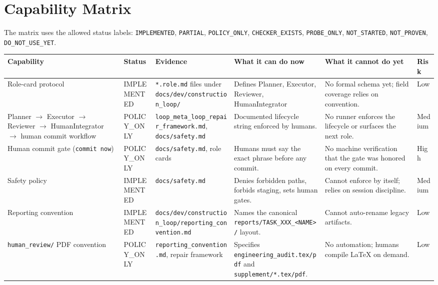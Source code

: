 \documentclass[11pt,a4paper]{article}
\begin{document}
\section{Capability Matrix}

The matrix uses the allowed status labels:
\texttt{IMPLEMENTED}, \texttt{PARTIAL}, \texttt{POLICY\_ONLY},
\texttt{CHECKER\_EXISTS}, \texttt{PROBE\_ONLY}, \texttt{NOT\_STARTED},
\texttt{NOT\_PROVEN}, \texttt{DO\_NOT\_USE\_YET}.

\renewcommand{\arraystretch}{1.15}
\small
\begin{longtable}{p{3.2cm} p{2.1cm} p{3.4cm} p{3.4cm} p{3.4cm} p{2.4cm}}
\toprule
\textbf{Capability} & \textbf{Status} & \textbf{Evidence} &
\textbf{What it can do now} & \textbf{What it cannot do yet} & \textbf{Risk} \\
\midrule
\endhead
Role-card protocol &
  IMPLEMENTED &
  \texttt{*.role.md} files under
  \texttt{docs/dev/construction\_loop/} &
  Defines Planner, Executor, Reviewer, HumanIntegrator &
  No formal schema yet; field coverage relies on convention. &
  Low \\ \hline
Planner $\rightarrow$ Executor $\rightarrow$ Reviewer $\rightarrow$
  HumanIntegrator $\rightarrow$ human commit workflow &
  POLICY\_ONLY &
  \texttt{loop\_meta\_loop\_repair\_framework.md}, \texttt{docs/safety.md} &
  Documented lifecycle string enforced by humans. &
  No runner enforces the lifecycle or surfaces the next role. &
  Medium \\ \hline
Human commit gate (\texttt{commit now}) &
  POLICY\_ONLY &
  \texttt{docs/safety.md}, role cards &
  Humans must say the exact phrase before any commit. &
  No machine verification that the gate was honored on every commit. &
  High \\ \hline
Safety policy &
  IMPLEMENTED &
  \texttt{docs/safety.md} &
  Denies forbidden paths, forbids staging, sets human gates. &
  Cannot enforce by itself; relies on session discipline. &
  Medium \\ \hline
Reporting convention &
  IMPLEMENTED &
  \texttt{docs/dev/construction\_loop/reporting\_convention.md} &
  Names the canonical \texttt{reports/TASK\_XXX\_<NAME>/} layout. &
  Cannot auto-rename legacy artifacts. &
  Low \\ \hline
\texttt{human\_review/} PDF convention &
  POLICY\_ONLY &
  \texttt{reporting\_convention.md}, repair framework &
  Specifies \texttt{engineering\_audit.tex/pdf} and
  \texttt{supplement/*.tex/pdf}. &
  No automation; humans compile LaTeX on demand. &
  Low \\ \hline

\end{longtable}
\end{document}
